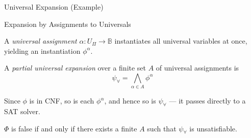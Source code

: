 \documentclass[utf8,aspectratio=169,ngerman,english]{beamer}
\begin{document}
\begin{frame}{Universal Expansion (Example)}


\end{frame}


\begin{frame}{Expansion by Assignments to Universals}

\small

A \emph{universal assignment} $\alpha : U_\Pi \to \mathbb{B}$ instantiates all universal variables at once, yielding an instantiation $\phi^\alpha$.

\medskip
A \emph{partial universal expansion} over a finite set $A$ of universal assignments is
\[
    \psi_\forall = \bigwedge_{\alpha \in A} \phi^\alpha
\]

Since $\phi$ is in CNF, so is each $\phi^\alpha$, and hence so is $\psi_\forall$ --- it passes directly to a SAT solver.

\medskip
$\Phi$ is false if and only if there exists a finite $A$ such that $\psi_\forall$ is unsatisfiable.

\end{frame}
\end{document}
